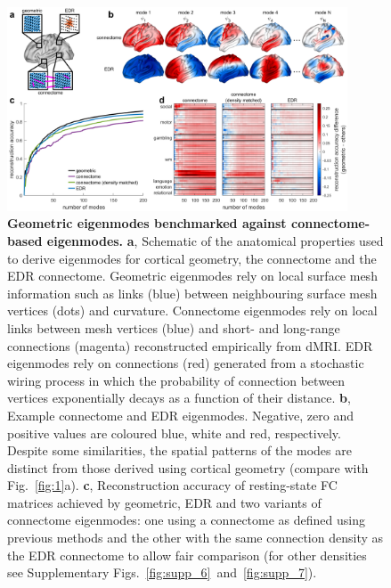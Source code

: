 \documentclass[sn-mathphys-num]{sn-jnl}%
\theoremstyle{thmstyleone}%
\theoremstyle{thmstyletwo}%
\theoremstyle{thmstylethree}%
\begin{document}
\begin{figure}[!htb]
	\centering
	\includegraphics[width=0.9\textwidth]{fig/fig_2.pdf}
	\caption{\textbf{Geometric eigenmodes benchmarked against connectome-based eigenmodes.}
	\textbf{a}, Schematic of the anatomical properties used to derive eigenmodes for cortical geometry, the connectome and the EDR connectome. 
	Geometric eigenmodes rely on local surface mesh information such as links (blue) between neighbouring surface mesh vertices (dots) and curvature. 
	Connectome eigenmodes rely on local links between mesh vertices (blue) and short- and long-range connections (magenta) reconstructed empirically from dMRI. 
	EDR eigenmodes rely on connections (red) generated from a stochastic wiring process in which the probability of connection between vertices exponentially decays as a function of their distance.
	\textbf{b}, Example connectome and EDR eigenmodes. 
	Negative, zero and positive values are coloured blue, white and red, respectively. 
	Despite some similarities, the spatial patterns of the modes are distinct from those derived using cortical geometry (compare with Fig.~\ref{fig:1}a).
	\textbf{c}, Reconstruction accuracy of resting-state FC matrices achieved by geometric, EDR and two variants of connectome eigenmodes: 
	one using a connectome as defined using previous methods\cite{naze2021robustness} and the other with the same connection density as the EDR connectome to allow fair comparison (for other densities see Supplementary Figs.~\ref{fig:supp_6}~and~\ref{fig:supp_7}).
	} \label{fig:2}
\end{figure}
\end{document}
